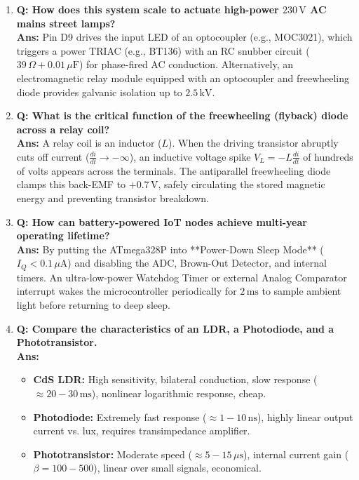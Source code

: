 \documentclass[10pt,a4paper]{article}
\begin{document}
\begin{enumerate}[leftmargin=*]
    \item \textbf{Q: How does this system scale to actuate high-power $230\,\text{V}$ AC mains street lamps?}\\
    \textbf{Ans:} Pin D9 drives the input LED of an optocoupler (e.g., MOC3021), which triggers a power TRIAC (e.g., BT136) with an RC snubber circuit ($39\,\Omega + 0.01\,\mu\text{F}$) for phase-fired AC conduction. Alternatively, an electromagnetic relay module equipped with an optocoupler and freewheeling diode provides galvanic isolation up to $2.5\,\text{kV}$.

    \item \textbf{Q: What is the critical function of the freewheeling (flyback) diode across a relay coil?}\\
    \textbf{Ans:} A relay coil is an inductor ($L$). When the driving transistor abruptly cuts off current ($\frac{di}{dt} \to -\infty$), an inductive voltage spike $V_L = -L \frac{di}{dt}$ of hundreds of volts appears across the terminals. The antiparallel freewheeling diode clamps this back-EMF to $+0.7\,\text{V}$, safely circulating the stored magnetic energy and preventing transistor breakdown.

    \item \textbf{Q: How can battery-powered IoT nodes achieve multi-year operating lifetime?}\\
    \textbf{Ans:} By putting the ATmega328P into **Power-Down Sleep Mode** ($I_Q < 0.1\,\mu\text{A}$) and disabling the ADC, Brown-Out Detector, and internal timers. An ultra-low-power Watchdog Timer or external Analog Comparator interrupt wakes the microcontroller periodically for $2\,\text{ms}$ to sample ambient light before returning to deep sleep.

    \item \textbf{Q: Compare the characteristics of an LDR, a Photodiode, and a Phototransistor.}\\
    \textbf{Ans:} 
    \begin{itemize}[leftmargin=*]
        \item \textbf{CdS LDR:} High sensitivity, bilateral conduction, slow response ($\approx 20-30\,\text{ms}$), nonlinear logarithmic response, cheap.
        \item \textbf{Photodiode:} Extremely fast response ($\approx 1-10\,\text{ns}$), highly linear output current vs. lux, requires transimpedance amplifier.
        \item \textbf{Phototransistor:} Moderate speed ($\approx 5-15\,\mu\text{s}$), internal current gain ($\beta = 100-500$), linear over small signals, economical.
    \end{itemize}


\end{enumerate}
\end{document}
